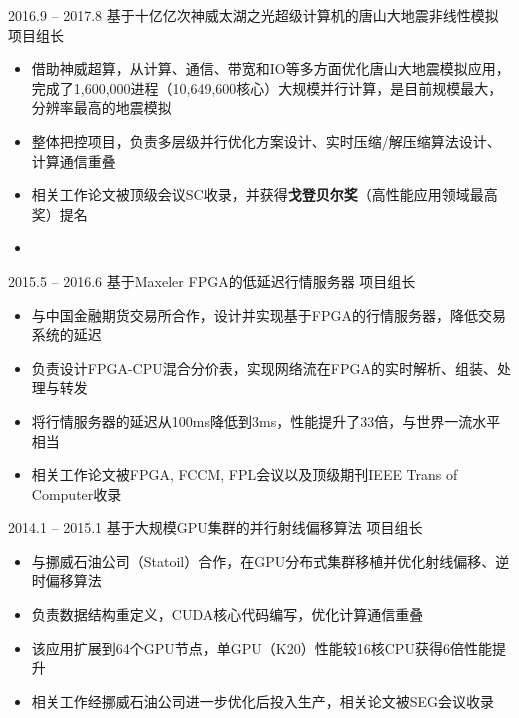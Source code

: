 \documentclass[localFont]{awesome-source-cv} %
\begin{document}
\begin{experiences}
\experience
{2016.9 -- 2017.8}   {基于十亿亿次神威太湖之光超级计算机的唐山大地震非线性模拟     \hspace{3.4cm} 项目组长}{}{}{}
{\begin{itemize}
	\item 借助神威超算，从计算、通信、带宽和IO等多方面优化唐山大地震模拟应用，完成了1,600,000进程（10,649,600核心）大规模并行计算，是目前规模最大，分辨率最高的地震模拟
	\item 整体把控项目，负责多层级并行优化方案设计、实时压缩/解压缩算法设计、计算通信重叠
	\item 相关工作论文被顶级会议SC收录，并获得\textbf{戈登贝尔奖}（高性能应用领域最高奖）提名
	\item \faGithub {}
\end{itemize}}{}

\emptySeparator
\experience
{2015.5 -- 2016.6}   {基于Maxeler FPGA的低延迟行情服务器     \hspace{7.2cm} 项目组长}{}{}{}
{\begin{itemize}
	\item 与中国金融期货交易所合作，设计并实现基于FPGA的行情服务器，降低交易系统的延迟
	\item 负责设计FPGA-CPU混合分价表，实现网络流在FPGA的实时解析、组装、处理与转发
	\item 将行情服务器的延迟从100ms降低到3ms，性能提升了33倍，与世界一流水平相当
	\item 相关工作论文被FPGA, FCCM, FPL会议以及顶级期刊IEEE Trans of Computer收录
\end{itemize}}{}

\emptySeparator
\experience
{2014.1 -- 2015.1}   {基于大规模GPU集群的并行射线偏移算法     \hspace{6.8cm} 项目组长}{}{}{}
{\begin{itemize}
	\item 与挪威石油公司（Statoil）合作，在GPU分布式集群移植并优化射线偏移、逆时偏移算法
	\item 负责数据结构重定义，CUDA核心代码编写，优化计算通信重叠
	\item 该应用扩展到64个GPU节点，单GPU（K20）性能较16核CPU获得6倍性能提升
	\item 相关工作经挪威石油公司进一步优化后投入生产，相关论文被SEG会议收录
\end{itemize}}{}

\end{experiences}
\end{document}
